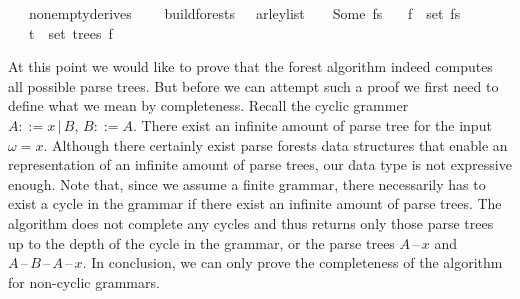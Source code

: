 \begin{isabellebody}
\ \ \ {\isachardoublequoteopen}nonempty{\isacharunderscore}{\kern0pt}derives\ {\isasymG}{\isachardoublequoteclose}\isanewline
\ \ \ {\isachardoublequoteopen}build{\isacharunderscore}{\kern0pt}forests\ {\isasymG}\ {\isasymomega}\ {\isacharparenleft}{\kern0pt}{\isasymE}arley{\isacharunderscore}{\kern0pt}list\ {\isasymG}\ {\isasymomega}{\isacharparenright}{\kern0pt}\ {\isacharequal}{\kern0pt}\ Some\ fs{\isachardoublequoteclose}\isanewline
\ \ \ {\isachardoublequoteopen}f\ {\isasymin}\ set\ fs{\isachardoublequoteclose}\isanewline
\ \ \ {\isachardoublequoteopen}t\ {\isasymin}\ set\ {\isacharparenleft}{\kern0pt}trees\ f{\isacharparenright}{\kern0pt}{\isachardoublequoteclose}\isanewline
\ \ \ {\isachardoublequoteopen}{\isasymG}\ {\isasymturnstile}\ {\isacharbrackleft}{\kern0pt}{\isasymSS}\ {\isasymG}{\isacharbrackright}{\kern0pt}\ {\isasymRightarrow}\isactrlsup {\isacharasterisk}{\kern0pt}\ {\isasymomega}{\isachardoublequoteclose}%
\isadelimproof
%
\endisadelimproof
%
\isatagproof
%
\endisatagproof
{\isafoldproof}%
%
\isadelimproof
%
\endisadelimproof
%
\begin{isamarkuptext}%
%
\end{isamarkuptext}\isamarkuptrue%
%
\isadelimdocument
%
\endisadelimdocument
%
\isatagdocument
%
\isamarkuptrue%
%
\endisatagdocument
{\isafolddocument}%
%
\isadelimdocument
%
\endisadelimdocument
%
\begin{isamarkuptext}%
At this point we would like to prove that the forest algorithm indeed computes all possible parse trees.
But before we can attempt such a proof we first need to define what we mean by completeness. Recall the
cyclic grammer $A ::= x \, | \, B, \, B ::= A$. There exist an infinite amount of parse tree for the
input $\omega = x$. Although there certainly exist parse forests data structures that enable an representation
of an infinite amount of parse trees, our data type  is not expressive enough. Note that,
since we assume a finite grammar, there necessarily has to exist a cycle in the grammar if there exist
an infinite amount of parse trees. The algorithm  does not complete any cycles and
thus returns only those parse trees up to the depth of the cycle in the grammar, or the parse trees
$A \, \text{--} \, x$ and $A \, \text{--} \, B \, \text{--} \, A \, \text{--} \, x$. In conclusion,
we can only prove the completeness of the algorithm for non-cyclic grammars.


\end{isamarkuptext}
\end{isabellebody}
